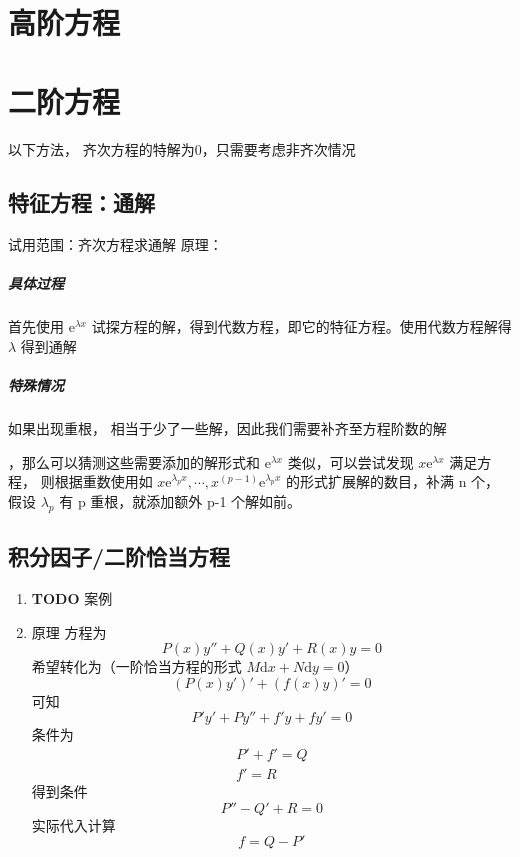 \documentclass[11pt]{report}
\begin{document}
\chapter{高阶方程}
\label{sec:orgd537f32}
\chapter{二阶方程}
\label{sec:orgf4ae2f8}
以下方法，
齐次方程的特解为0，只需要考虑非齐次情况
\section{特征方程：通解}
\label{sec:org1849277}
试用范围：齐次方程求通解
原理：
\paragraph{具体过程}
首先使用 \(\mathrm{e}^{\lambda x}\) 试探方程的解，得到代数方程，即它的特征方程。使用代数方程解得 \(\lambda\) 得到通解
\paragraph{特殊情况}
如果出现重根，
相当于少了一些解，因此我们需要补齐至方程阶数的解

，那么可以猜测这些需要添加的解形式和 \(\mathrm{e}^{\lambda x}\) 类似，可以尝试发现 \(x\mathrm{e}^{\lambda x}\) 满足方程，
则根据重数使用如 \(x\mathrm{e}^{\lambda_{p} x},\cdots,x^{(p-1)}\mathrm{e}^{\lambda_{p}x}\) 的形式扩展解的数目，补满 n 个，假设  \(\lambda_p\) 有 p 重根，就添加额外 p-1 个解如前。
\section{积分因子/二阶恰当方程}
\label{sec:org4aa3c2c}
\begin{enumerate}
\item {\bfseries\sffamily TODO} 案例
\label{sec:orgc12b679}

\item 原理
\label{sec:orga73971e}
方程为
\begin{equation}
\label{eq:14}
P(x)y''+Q(x)y'+R(x)y=0
\end{equation}
希望转化为（一阶恰当方程的形式 \(M\mathrm{d}x+N\mathrm{d}y=0\)）
\begin{equation}
\label{eq:15}
(P(x)y')'+(f(x)y)'=0
\end{equation}
可知
\begin{equation}
\label{eq:18}
P'y'+Py''+f'y+fy'=0
\end{equation}
条件为
\begin{align*}
P'+f'=Q\\
f'=R
\end{align*}
得到条件
\begin{equation}
\label{eq:19}
P''-Q'+R=0
\end{equation}
实际代入计算
\begin{equation}
\label{eq:20}
f=Q-P'
\end{equation}
\end{enumerate}
\end{document}
